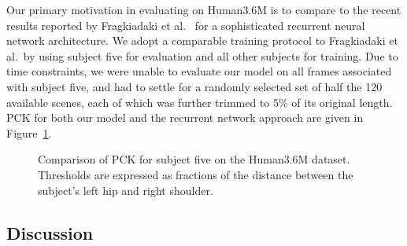 \documentclass[runningheads]{llncs}
\begin{document}
Our primary motivation in evaluating on Human3.6M is to compare to the recent
results reported by Fragkiadaki et al.~\cite{fragkiadaki2015recurrent} for a
sophisticated recurrent neural network architecture. We adopt a comparable
training protocol to Fragkiadaki et al.\ by using subject five for evaluation and
all other subjects for training. Due to time constraints, we were unable to
evaluate our model on all frames associated with subject five, and had to settle
for a randomly selected set of half the 120 available scenes, each of which was
further trimmed to 5\% of its original length. PCK for both our model and the
recurrent network approach are given in Figure~\ref{fig:h36m-pck}.

\begin{figure}[t]
\begin{center}

\end{center}
\vspace{-5mm}
\caption{Comparison of PCK for subject five on the Human3.6M dataset. Thresholds
are expressed as fractions of the distance between the subject's left hip and
right shoulder.}
\label{fig:h36m-pck}
\end{figure}

\subsection{Discussion}



\end{document}
